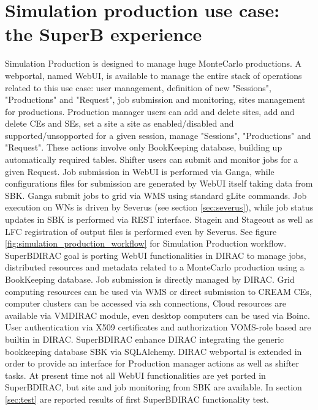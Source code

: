 \documentclass[a4paper]{jpconf}
\begin{document}
\section{Simulation production use case: the SuperB experience}
Simulation Production is designed to manage huge MonteCarlo productions.
A webportal, named WebUI\cite{ref:webui}, is available to manage the entire stack of operations related to this use case: user management, definition of new "Sessions", "Productions" and "Request", job submission and monitoring, sites management for productions. 
Production manager users can add and delete sites, add and delete CEs and SEs, set a site a site as enabled/disabled and supported/unsopported for a given session, manage "Sessions", "Productions" and "Request". These actions involve only BookKeeping database, building up automatically required tables.
Shifter users can submit and monitor jobs for a given Request. Job submission in WebUI is performed via Ganga\cite{ref:ganga}, while configurations files for submission are generated by WebUI itself taking data from SBK. Ganga submit jobs to grid via WMS using standard gLite commands. Job execution on WNs is driven by Severus (see section \ref{sec:severus}), while job status updates in SBK is performed via REST interface. Stagein and Stageout as well as LFC registration of output files is performed even by Severus. See figure \ref{fig:simulation_production_workflow} for Simulation Production workflow.\\

SuperBDIRAC goal is porting WebUI functionalities in DIRAC to manage jobs, distributed resources and metadata related to a MonteCarlo production using a BookKeeping database.
Job submission is directly managed by DIRAC. Grid computing resources can be used via WMS or direct submission to CREAM CEs, computer clusters can be accessed via ssh connections, Cloud resources are available via VMDIRAC module, even desktop computers can be used via Boinc. User authentication via X509 certificates and authorization VOMS-role based are builtin in DIRAC.
SuperBDIRAC enhance DIRAC integrating the generic bookkeeping database SBK via SQLAlchemy.
DIRAC webportal is extended in order to provide an interface for Production manager actions as well as shifter tasks.
At present time not all WebUI functionalities are yet ported in SuperBDIRAC, but site and job monitoring from SBK are available.
In section \ref{sec:test} are reported results of first SuperBDIRAC functionality test.

\end{document}
